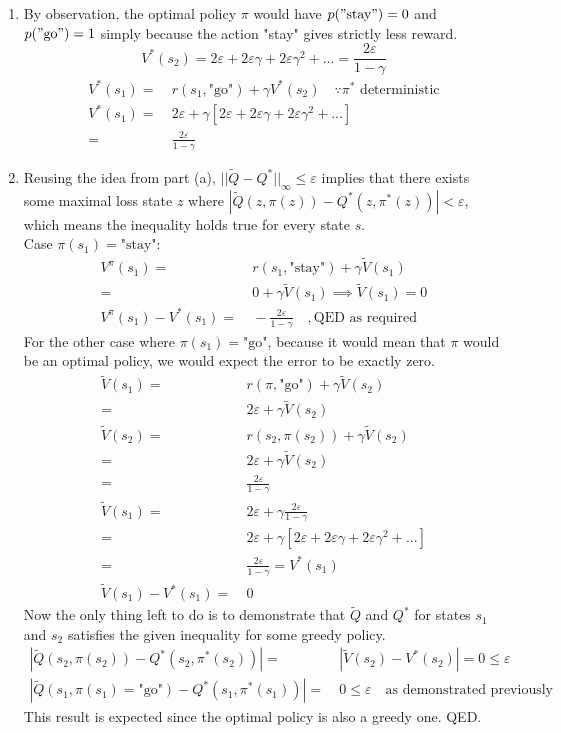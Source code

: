 \documentclass[11pt]{article}
\let\epsilon\varepsilon
\begin{document}
\begin{enumerate}[label=(\alph*)]
	\item By observation, the optimal policy $\pi$ would have $p(\mathrm{"stay"})=0$ and $p(\mathrm{"go"})=1$ simply because the action "stay" gives strictly less reward.
	$$V^*(s_2) = 2\epsilon+2\epsilon\gamma+2\epsilon\gamma^2+... = \frac{2\epsilon}{1-\gamma}$$
	\begin{align*}
	V^*(s_1) =&\ r(s_1, \textrm{"go"}) + \gamma V^*(s_2) \quad \because \pi^* \textrm{ deterministic} \\
	V^*(s_1) =&\ 2\epsilon + \gamma[2\epsilon+2\epsilon\gamma+2\epsilon\gamma^2+...] \\ 
	=&\ \frac{2\epsilon}{1-\gamma}
	\end{align*}
	
	\item
	Reusing the idea from part (a), $||\tilde{Q} - Q^*||_\infty \leq \epsilon$ implies that there exists some maximal loss state $z$ where $|\tilde{Q}(z,\pi(z)) - Q^*(z, \pi^*(z))| < \epsilon$, which means the inequality holds true for every state $s$. \\
	Case $\pi(s_1)=\textrm{"stay"}$:
	\begin{align*}
	V^\pi(s_1) =&\ r(s_1,\textrm{"stay"}) + \gamma\tilde{V}(s_1) \\
	=&\ 0 + \gamma\tilde{V}(s_1) \implies \tilde{V}(s_1) = 0 \\
	V^\pi(s_1) - V^*(s_1) =&\ -\frac{2\epsilon}{1-\gamma} \quad ,\textrm{QED as required}
	\end{align*}
	For the other case where $\pi(s_1)=\textrm{"go"}$, because it would mean that $\pi$ would be an optimal policy, we would expect the error to be exactly zero. \\
	\begin{align*}
	\tilde{V}(s_1) =&\ r(\pi,\textrm{"go"}) + \gamma\tilde{V}(s_2) \\
	=&\ 2\epsilon + \gamma \tilde{V}(s_2) \\
	\tilde{V}(s_2) =&\ r(s_2,\pi(s_2)) + \gamma \tilde{V}(s_2) \\
	=&\ 2\epsilon + \gamma \tilde{V}(s_2) \\
	=&\ \frac{2\epsilon}{1-\gamma} \\
	\tilde{V}(s_1) =&\ 2\epsilon + \gamma \frac{2\epsilon}{1-\gamma} \\
	=&\ 2\epsilon + \gamma [2\epsilon+2\epsilon\gamma+2\epsilon\gamma^2+...] \\
	=&\ \frac{2\epsilon}{1-\gamma} = V^*(s_1) \\
	\tilde{V}(s_1) - V^*(s_1) =&\ 0 
	\end{align*}
	Now the only thing left to do is to demonstrate that $\tilde{Q}$ and $Q^*$ for states $s_1$ and $s_2$ satisfies the given inequality for some greedy policy.
	\begin{align*}
	|\tilde{Q}(s_2, \pi(s_2)) - Q^*(s_2, \pi^*(s_2))| =&\ |\tilde{V}(s_2) - V^*(s_2)| = 0 \leq \epsilon \\
	|\tilde{Q}(s_1, \pi(s_1)=\textrm{"go"}) - Q^*(s_1, \pi^*(s_1))| =&\ 0 \leq \epsilon \quad \textrm{as demonstrated previously}
	\end{align*}
	This result is expected since the optimal policy is also a greedy one. QED.
	

\end{enumerate}
\end{document}
